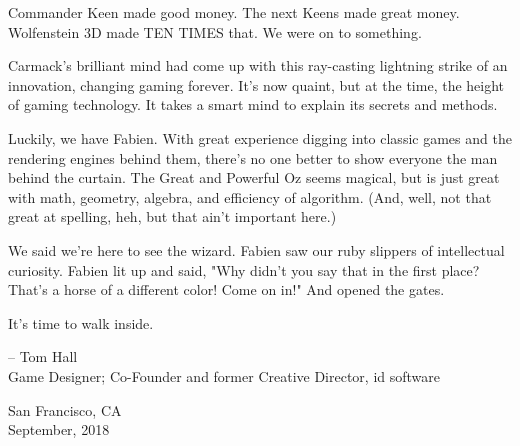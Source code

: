 Commander Keen made good money. The next Keens made great money. Wolfenstein 3D made TEN TIMES that.  We were on to something.\\
\par
Carmack's brilliant mind had come up with this ray-casting lightning strike of an innovation, changing gaming forever. It's now quaint, but at the time, the height of gaming technology.  It takes a smart mind to explain its secrets and methods.\\
\par
Luckily, we have Fabien.  With great experience digging into classic games and the rendering engines behind them, there's no one better to show everyone the man behind the curtain. The Great and Powerful Oz seems magical, but is just great with math, geometry, algebra, and efficiency of algorithm. (And, well, not that great at spelling, heh, but that ain't important here.)\\
\par
We said we're here to see the wizard. Fabien saw our ruby slippers of intellectual curiosity.
Fabien lit up and said, "Why didn't you say that in the first place? That's a horse of a different color! Come on in!" And opened the gates.\\
\par
It's time to walk inside.\\
\par
-- Tom Hall\\
Game Designer;  Co-Founder and former Creative Director, id software\\
\par
San Francisco, CA\\
September, 2018\\
\thispagestyle{plain} %